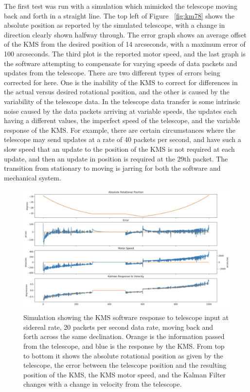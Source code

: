 \documentclass[manuscript]{aastex}
\begin{document}
The first test was run with a simulation which mimicked the telescope moving back and forth in a straight line. The top left of Figure ~\ref{fig:km78} shows the absolute position as reported by the simulated telescope, with a change in direction clearly shown halfway through. The error graph shows an average offset of the KMS from the desired position of 14 arcseconds, with a maximum error of 100 arcseconds. The third plot is the reported motor speed, and the last graph is the software attempting to compensate for varying speeds of data packets and updates from the telescope. There are two different types of errors being corrected for here. One is the inability of the KMS to correct for differences in the actual versus desired rotational position, and the other is caused by the variability of the telescope data. In the telescope data transfer is some intrinsic noise caused by the data packets arriving at variable speeds, the updates each having a different values, the imperfect speed of the telescope, and the variable response of the KMS. For example, there are certain circumstances where the telescope may send updates at a rate of 40 packets per second, and have such a slow speed that an update to the position of the KMS is not required at each update, and then an update in position is required at the 29th packet. The transition from stationary to moving is jarring for both the software and mechanical system. 

\begin{figure}[H]
	\centering
	\captionsetup{width=\textwidth}
	\includegraphics[width=\textwidth]{km7.png}%
	\caption[Simulated KMS Performance, Simple Rastering Scan]{Simulation showing the KMS software response to telescope input at sidereal rate, 20 packets per second data rate, moving back and forth across the same declination. Orange is the information passed from the telescope, and blue is the response by the KMS. From top to bottom it shows the absolute rotational position as given by the telescope, the error between the telescope position and the resulting position of the KMS, the KMS motor speed, and the Kalman Filter changes with a change in velocity from the telescope.}%
	\label{fig:km7}%
\end{figure}
\end{document}
